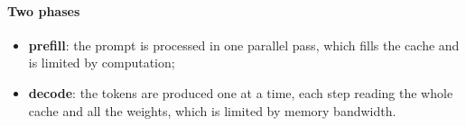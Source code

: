 \paragraph{Two phases}
\begin{itemize}
    \item \textbf{prefill}: the prompt is processed in one parallel pass, which fills the
        cache and is limited by computation;
    \item \textbf{decode}: the tokens are produced one at a time, each step reading the
        whole cache and all the weights, which is limited by memory bandwidth.
\end{itemize}

